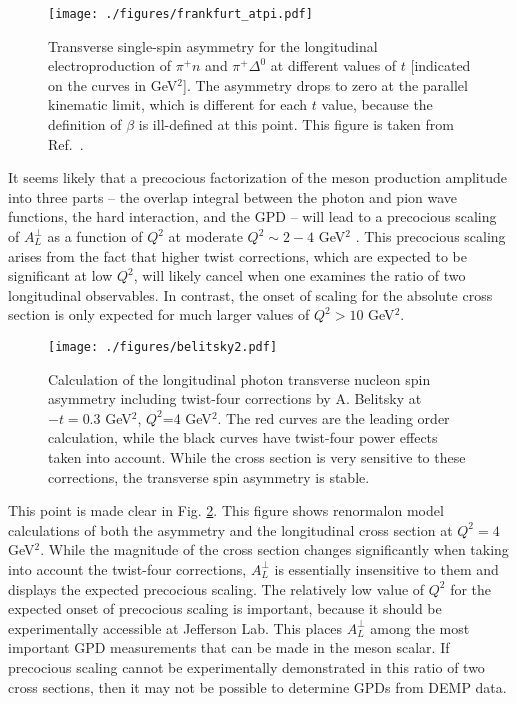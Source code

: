 \begin{figure}[hbt!]
\begin{center}
\texttt{[image: ./figures/frankfurt\_atpi.pdf]}
\end{center}
\caption{\label{fig:frankfurt_atpi}
\footnotesize{
Transverse single-spin asymmetry for the longitudinal electroproduction of
$\pi^+n$ and $\pi^+\Delta^0$ at different values of $t$ [indicated on the
curves in GeV$^2$].  The asymmetry drops to zero at the parallel kinematic
limit, which is different for each $t$ value, because the definition of $\beta$
is ill-defined at this point.  This figure is taken from
Ref.~.
}}
\end{figure}

It seems likely that a precocious factorization of the meson production
amplitude into three parts -- the overlap integral between the photon and pion
wave functions, the hard interaction, and the GPD -- will lead to a precocious
scaling of $A_L^{\perp}$ as a function of $Q^2$ at moderate $Q^2\sim 2-4$
GeV$^2$ \cite{Fr99}.  This precocious scaling arises from the fact that higher
twist corrections, which are expected to be significant at low $Q^2$, will
likely cancel when one examines the ratio of two longitudinal observables.  In
contrast, the onset of scaling for the absolute cross section is only expected
for much larger values of $Q^2>10$ GeV$^2$.

\begin{figure}[hbt!]
\begin{center}
\texttt{[image: ./figures/belitsky2.pdf]}
\end{center}
\caption{\label{fig:belitsky_atpi}
\footnotesize{
Calculation of the longitudinal photon transverse nucleon spin asymmetry
including twist-four corrections by A. Belitsky \cite{belitsky} at $-t=0.3$
GeV$^2$, $Q^2$=4 GeV$^2$.  The red curves are the leading order calculation,
while the black curves have twist-four power effects taken into account.  While
the cross section is very sensitive to these corrections, the transverse spin
asymmetry is stable.}}
\end{figure}

This point is made clear in Fig. \ref{fig:belitsky_atpi}.  This figure shows
renormalon model calculations \cite{belitsky} of both the asymmetry and the
longitudinal cross section at $Q^2=4$ GeV$^2$.  While the magnitude of the
cross section changes significantly when taking into account the twist-four
corrections, $A_L^{\perp}$ is essentially insensitive to them and displays the
expected precocious scaling.  The relatively low value of $Q^2$ for the
expected onset of precocious scaling is important, because it should be
experimentally accessible at Jefferson Lab.  This places $A_L^{\perp}$ among
the most important GPD measurements that can be made in the meson scalar.  If
precocious scaling cannot be experimentally demonstrated in this ratio of two
cross sections, then it may not be possible to determine GPDs from DEMP data.

